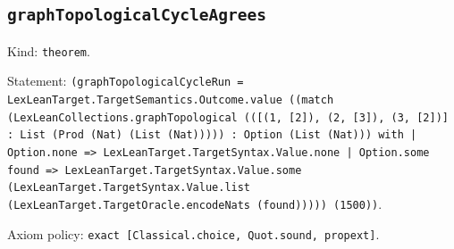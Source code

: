 \documentclass[11pt]{article}
\begin{document}
\subsection*{\texttt{graphTopologicalCycleAgrees}}
\noindent Kind: \texttt{theorem}.\par
\noindent Statement: \texttt{(graphTopologicalCycleRun = LexLeanTarget.TargetSemantics.Outcome.value ((match (LexLeanCollections.graphTopological (([(1, [2]), (2, [3]), (3, [2])] : List (Prod (Nat) (List (Nat))))) : Option (List (Nat))) with | Option.none => LexLeanTarget.TargetSyntax.Value.none | Option.some found => LexLeanTarget.TargetSyntax.Value.some (LexLeanTarget.TargetSyntax.Value.list (LexLeanTarget.TargetOracle.encodeNats (found))))) (1500))}.\par
\noindent Axiom policy: \texttt{exact [Classical.choice, Quot.sound, propext]}.\par
\end{document}
